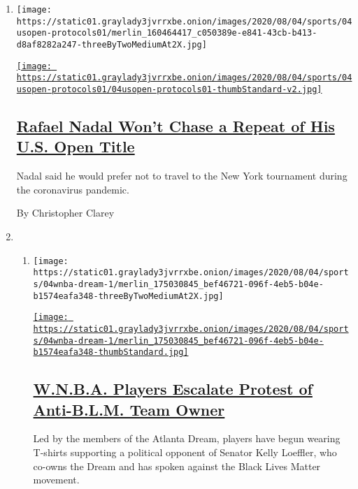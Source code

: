 \begin{enumerate}
\def\labelenumi{\arabic{enumi}.}
\item
  \texttt{[image: https://static01.graylady3jvrrxbe.onion/images/2020/08/04/sports/04usopen-protocols01/merlin\_160464417\_c050389e-e841-43cb-b413-d8af8282a247-threeByTwoMediumAt2X.jpg]}

  \href{/2020/08/04/sports/tennis/rafael-nadal-us-open.html}{\texttt{[image: https://static01.graylady3jvrrxbe.onion/images/2020/08/04/sports/04usopen-protocols01/04usopen-protocols01-thumbStandard-v2.jpg]}}

  \hypertarget{rafael-nadal-wont-chase-a-repeat-of-his-us-open-title}{%
  \subsection{\texorpdfstring{\href{/2020/08/04/sports/tennis/rafael-nadal-us-open.html}{Rafael
  Nadal Won't Chase a Repeat of His U.S. Open
  Title}}{Rafael Nadal Won't Chase a Repeat of His U.S. Open Title}}\label{rafael-nadal-wont-chase-a-repeat-of-his-us-open-title}}

  Nadal said he would prefer not to travel to the New York tournament
  during the coronavirus pandemic.

  By Christopher Clarey
\item
  \begin{enumerate}
  \def\labelenumii{\arabic{enumii}.}
  \item
    \texttt{[image: https://static01.graylady3jvrrxbe.onion/images/2020/08/04/sports/04wnba-dream-1/merlin\_175030845\_bef46721-096f-4eb5-b04e-b1574eafa348-threeByTwoMediumAt2X.jpg]}

    \href{/2020/08/04/sports/basketball/wnba-dream-loeffler-warnock.html}{\texttt{[image: https://static01.graylady3jvrrxbe.onion/images/2020/08/04/sports/04wnba-dream-1/merlin\_175030845\_bef46721-096f-4eb5-b04e-b1574eafa348-thumbStandard.jpg]}}

    \hypertarget{wnba-players-escalate-protest-of-anti-blm-team-owner}{%
    \subsection{\texorpdfstring{\href{/2020/08/04/sports/basketball/wnba-dream-loeffler-warnock.html}{W.N.B.A.
    Players Escalate Protest of Anti-B.L.M. Team
    Owner}}{W.N.B.A. Players Escalate Protest of Anti-B.L.M. Team Owner}}\label{wnba-players-escalate-protest-of-anti-blm-team-owner}}

    Led by the members of the Atlanta Dream, players have begun wearing
    T-shirts supporting a political opponent of Senator Kelly Loeffler,
    who co-owns the Dream and has spoken against the Black Lives Matter
    movement.


\end{enumerate}
\end{enumerate}
